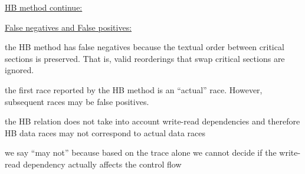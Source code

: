 \documentclass[landscape, a4paper]{article}
\begin{document}
\begin{minipage}[t]{0.2\linewidth}
	\begin{betterlist}
		\item \underline{HB method continue:}
		\begin{betterlist}
			\item \underline{False negatives and False positives:}
			\begin{betterlist}
				\item the HB method has \alert{false negatives} because the textual order between critical sections is preserved. That is, valid reorderings that swap critical sections are ignored. 
				\item the first race reported by the HB method is an \enquote{actual} race. However, subsequent races may be \alert{false positives}. 
				\begin{betterlist}
					\item the HB relation does not take into account write-read dependencies and therefore HB data races may not correspond to actual data races
					\item we say \enquote{may not} because based on the trace alone we cannot decide if the write-read dependency actually affects the control flow
				\end{betterlist}


\end{betterlist}
\end{betterlist}
\end{betterlist}
\end{minipage}
\end{document}
